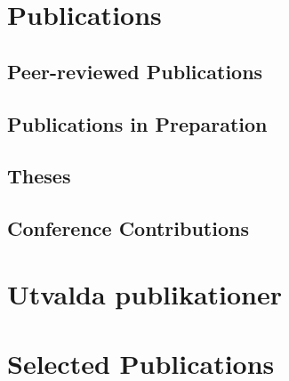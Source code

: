 \ifacademic
    \section{Publications}
        \subsection{Peer-reviewed Publications}
        \begin{refsection}
            \nocite{
                Breinl2017,
                GironsLopez2017,
                GironsLopez2017a,
                GironsLopez2016a,
                Mbanguka2016,
                GironsLopez2015
            }
            \printbibliography[heading=none]
        \end{refsection}
        \subsection{Publications in Preparation}
        \begin{refsection}
            \nocite{
                Rivera2017,
                Rivera2017a
            }
            \printbibliography[heading=none]
        \end{refsection}
        \subsection{Theses}
        \begin{refsection}
            \nocite{
                GironsLopez2016,
                GironsLopez2011
            }
            \printbibliography[heading=none]
        \end{refsection}
        \subsection{Conference Contributions}
        \begin{refsection}
            \nocite{
                Breinl2017a,
                GironsLopez2017b,
                GironsLopez2017c,
                GironsLopez2016b,
                GironsLopez2016c,
                Rivera2016,
                Rivera2015,
                GironsLopez2013,
                Mbanguka2013
            }
            \printbibliography[heading=none]
        \end{refsection}
\else
    \ifswedish
        \section{Utvalda publikationer}
    \else
        \section{Selected Publications}
    \fi
    \begin{refsection}
        \nocite{
        	GironsLopez2017,
        	GironsLopez2016a,
        	GironsLopez2015
        }
        \printbibliography[heading=none]
    \end{refsection}
\fi
